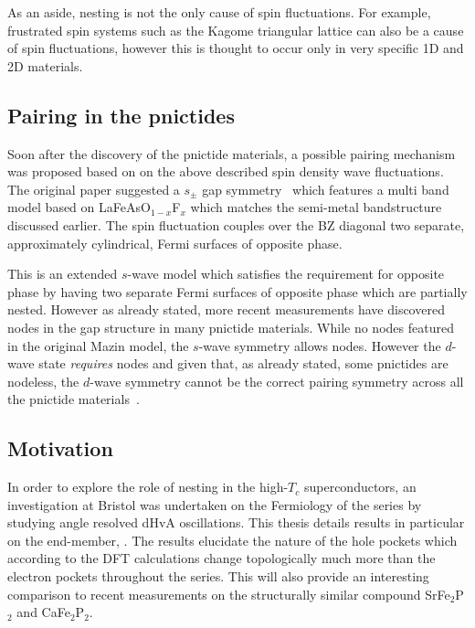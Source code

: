 As an aside, nesting is not the only cause of spin fluctuations. For example, frustrated spin systems such as the Kagome triangular lattice can also be a cause of spin fluctuations, however this is thought to occur only in very specific 1D and 2D materials.

\subsection{Pairing in the pnictides}

Soon after the discovery of the pnictide materials, a possible pairing mechanism was proposed based on on the above described spin density wave fluctuations. The original paper suggested a $s_{\pm}$ gap symmetry~\cite{Mazin2008} which features a multi band model based on LaFeAsO$_{1-x}$F$_x$ which matches the semi-metal bandstructure discussed earlier. The spin fluctuation couples over the \ac{BZ} diagonal two separate, approximately cylindrical, Fermi surfaces of opposite phase. 

This is an extended $s$-wave model which satisfies the requirement for opposite phase by having two separate Fermi surfaces of opposite phase which are partially nested. However as already stated, more recent measurements have discovered nodes in the gap structure in many pnictide materials. While no nodes featured in the original Mazin model, the $s$-wave symmetry allows nodes. However the $d$-wave state \emph{requires} nodes and given that, as already stated, some pnictides are nodeless, the $d$-wave symmetry cannot be the correct pairing symmetry across all the pnictide materials~\cite{Mazin2010}.


\subsection{Motivation}
    \label{Sec:Intro:MotivationPnictide}

In order to explore the role of nesting in the high-$T_c$ superconductors, an investigation at Bristol was undertaken on the Fermiology of the \BaFePAs series by studying angle resolved \ac{dHvA} oscillations. This thesis details results in particular on the end-member, \BaFeP. The results elucidate the nature of the hole pockets which according to the \ac{DFT} calculations change topologically much more than the electron pockets throughout the series. This will also provide an interesting comparison to recent measurements on the structurally similar compound SrFe$_2$P$_2$ and CaFe$_2$P$_2$.

